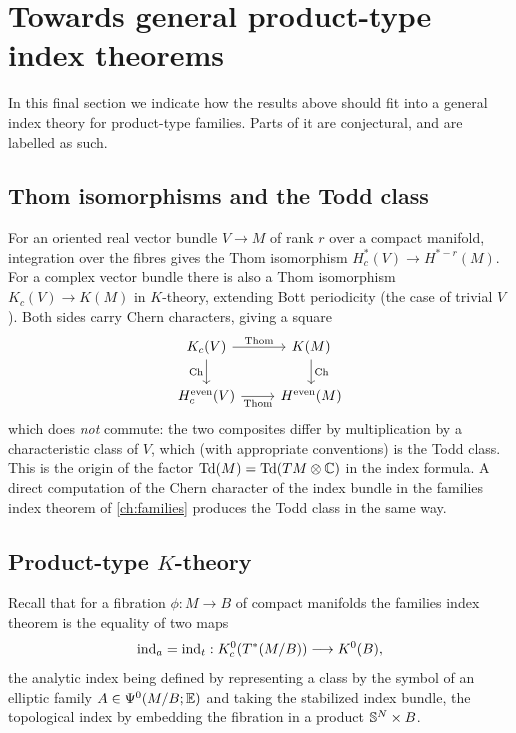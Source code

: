 \section{Towards general product-type index theorems}\label{eta:sec:general}

In this final section we indicate how the results above should fit into a general
index theory for product-type families. Parts of it are conjectural, and are labelled
as such.

\subsection{Thom isomorphisms and the Todd class} For an oriented real vector bundle
$V\longrightarrow M$ of rank $r$ over a compact manifold, integration over the fibres gives
the Thom isomorphism $H^*_c(V)\longrightarrow H^{*-r}(M)$. For a complex vector bundle
there is also a Thom isomorphism $K_c(V)\longrightarrow K(M)$ in $K$-theory, extending Bott
periodicity (the case of trivial $V$). Both sides carry Chern characters, giving a square
\[
\begin{tikzcd}
K_c(V)\arrow[r,"\text{Thom}"]\arrow[d,"\Ch"'] & K(M)\arrow[d,"\Ch"]\\
H^{\mathrm{even}}_c(V)\arrow[r,"\text{Thom}"'] & H^{\mathrm{even}}(M)
\end{tikzcd}
\]
which does \emph{not} commute: the two composites differ by multiplication by a
characteristic class of $V$, which (with appropriate conventions) is the Todd class. This
is the origin of the factor $\operatorname{Td}(M)=\operatorname{Td}(TM\otimes\mathbb{C})$ in the index formula. A direct
computation of the Chern character of the index bundle in the families index theorem
of \cref{ch:families} produces the Todd class in the same way.

\subsection{Product-type $K$-theory} Recall that for a fibration $\phi:M\longrightarrow B$ of
compact manifolds the families index theorem is the equality of two maps
\[
\operatorname{ind}_a=\operatorname{ind}_t:K^0_c(T^*(M/B))\longrightarrow K^0(B),
\]
the analytic index being defined by representing a class by the symbol of an elliptic
family $A\in\Psi^{0}(M/B;\mathbb E)$ and taking the stabilized index bundle, the
topological index by embedding the fibration in a product $\mathbb{S}^N\times B$.


